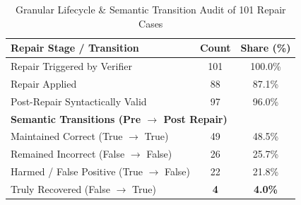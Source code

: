 \begin{table}[t]
\centering
\small
\caption{Granular Lifecycle \& Semantic Transition Audit of 101 Repair Cases}
\label{tab:repair_audit}
\begin{tabular}{lcc}
\toprule
\textbf{Repair Stage / Transition} & \textbf{Count} & \textbf{Share (\%)} \\
\midrule
Repair Triggered by Verifier & 101 & 100.0\% \\
Repair Applied & 88 & 87.1\% \\
Post-Repair Syntactically Valid & 97 & 96.0\% \\
\midrule
\multicolumn{3}{l}{\textbf{Semantic Transitions (Pre $\rightarrow$ Post Repair)}} \\
Maintained Correct (True $\rightarrow$ True) & 49 & 48.5\% \\
Remained Incorrect (False $\rightarrow$ False) & 26 & 25.7\% \\
Harmed / False Positive (True $\rightarrow$ False) & 22 & 21.8\% \\
Truly Recovered (False $\rightarrow$ True) & \textbf{4} & \textbf{4.0\%} \\
\bottomrule
\end{tabular}
\end{table}
